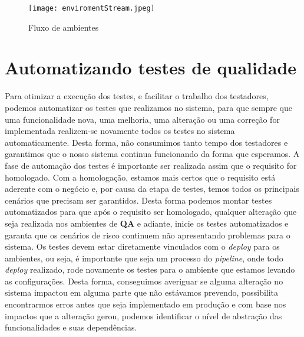       \begin{figure}[!h]
        \centering
        \texttt{[image: enviromentStream.jpeg]}
        \caption{Fluxo de ambientes}
        \label{Imagem:2}
      \end{figure}

    \section{Automatizando testes de qualidade}
      Para otimizar a execução dos testes, e facilitar o trabalho dos testadores,
      podemos automatizar os testes que realizamos no sistema, para que sempre que
      uma funcionalidade nova, uma melhoria, uma alteração ou uma correção for
      implementada realizem-se novamente todos os testes no sistema automaticamente.
      Desta forma, não consumimos tanto tempo dos testadores e garantimos que o
      nosso sistema continua funcionando da forma que esperamos. A fase de automação
      dos testes é importante ser realizada assim que o requisito for homologado.
      Com a homologação, estamos mais certos que o requisito está aderente com o
      negócio e, por causa da etapa de testes, temos todos os principais cenários
      que precisam ser garantidos. Desta forma podemos montar testes automatizados
      para que após o requisito ser homologado, qualquer alteração que seja realizada
      nos ambientes de \textbf{QA} e adiante, inicie os testes automatizados e
      garanta que os cenários de risco continuem não apresentando problemas para
      o sistema. \newline
      Os testes devem estar diretamente vinculados com o \textit{deploy} para os
      ambientes, ou seja, é importante que seja um processo do \textit{pipeline},
      onde todo \textit{deploy} realizado, rode novamente os testes para o ambiente
      que estamos levando as configurações. Desta forma, conseguimos averiguar se
      alguma alteração no sistema impactou em alguma parte que não estávamos prevendo,
      possibilita encontrarmos erros antes que seja implementado em produção e
      com base nos impactos que a alteração gerou, podemos identificar o nível de
      abstração das funcionalidades e suas dependências.

